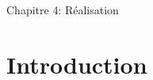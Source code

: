 \documentclass[12pt, letterpaper]{article}
\begin{document}
\begin{center}
    \huge{Chapitre 4: Réalisation}
\end{center}
\section{Introduction}


\section{}
\end{document}
